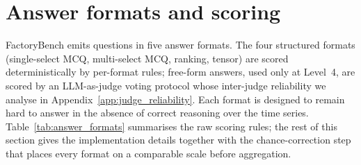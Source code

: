 %
%

\newpage
\appendix

\section{Answer formats and scoring}
\label{app:answer-formats}

FactoryBench emits questions in five answer formats. The four structured formats (single-select MCQ, multi-select MCQ, ranking, tensor) are scored deterministically by per-format rules; free-form answers, used only at Level~4, are scored by an LLM-as-judge voting protocol whose inter-judge reliability we analyse in Appendix~\ref{app:judge_reliability}. Each format is designed to remain hard to answer in the absence of correct reasoning over the time series. Table~\ref{tab:answer_formats} summarises the raw scoring rules; the rest of this section gives the implementation details together with the chance-correction step that places every format on a comparable scale before aggregation.

